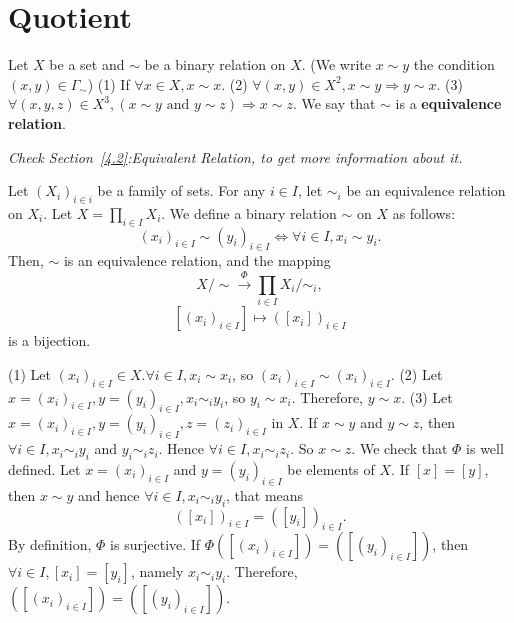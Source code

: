 \documentclass{book}
\numberwithin{equation}{section}
\begin{document}
\section{Quotient}\label{5.5}
\begin{definitionenv}
    Let $X$ be a set and $\sim$ be a binary relation on $X$. (We write $x\sim y$ the condition $(x,y)\in \Gamma_\sim$)
    \newline
    (1) If $\forall x\in X, x\sim x$.
    \newline
    (2) $\forall (x,y)\in X^2, x\sim y\Rightarrow y\sim x$.
    \newline
    (3) $\forall (x,y,z)\in X^3, (x\sim y \text{ and } y\sim z )\Rightarrow x\sim z$.
    \newline
    We say that $\sim $ is a \textbf{equivalence relation}.
\end{definitionenv}
\textit{Check Section~\ref{4.2}:Equivalent Relation, to get more information about it.}
\begin{propositionenv}
    Let $(X_i)_{i\in i}$ be a family of sets. For any $i\in I$, let $\sim_i$ be an equivalence relation on $X_i$. Let $X=\prod_{i\in I}X_i$. We define a binary relation $\sim$ on $X$ as follows:
    $$(x_i)_{i\in I}\sim (y_i)_{i\in I}\Leftrightarrow \forall i\in I, x_i\sim y_i.$$
    Then, $\sim $ is an equivalence relation, and the mapping
    $$X/\sim \overset{\Phi}{\longrightarrow }\prod_{i\in I}X_i/\sim_i,$$
    $$ [(x_i)_{i\in I}]\longmapsto  ([x_i])_{i\in I}$$
    is a bijection.
\end{propositionenv}
\begin{proofenv}
    \quad
    \newline
    (1) Let $(x_i)_{i\in I}\in X. \forall i\in I,x_i\sim x_i$, so $(x_i)_{i\in I}\sim(x_i)_{i\in I}$.
    \newline
    (2) Let $x=(x_i)_{i\in I},y=(y_i)_{i\in I}, x_i\sim_i y_i$, so $y_i\sim x_i$. Therefore, $y\sim x$.
    \newline 
    (3) Let $x=(x_i)_{i\in I},y=(y_i)_{i\in I},z=(z_i)_{i\in I}$ in $X$. If $x\sim y$ and $y\sim z$, then $\forall i \in I,x_i\sim_i y_i$ and $y_i\sim_i z_i$. Hence $\forall i \in I, x_i\sim_i z_i$. So $x\sim z$.
    \newline
    We check that $\Phi$ is well defined. Let $x=(x_i)_{i\in I}$ and $y=(y_i)_{i\in I}$ be elements of $X$. If $[x]=[y]$, then $x\sim y$ and hence $\forall i\in I, x_i\sim_i y_i$, that means 
    $$([x_i])_{i\in I}=([y_i])_{i\in I}.$$
    By definition, $\Phi$ is surjective. If $\Phi([(x_i)_{i\in I}])=([(y_i)_{i\in I}])$, then $\forall i\in I, [x_i]=[y_i]$, namely $x_i\sim_i y_i$. Therefore, $([(x_i)_{i\in I}])=([(y_i)_{i\in I}])$.
\end{proofenv}
\end{document}
